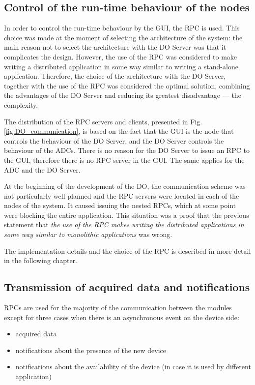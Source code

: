     \subsection{Control of the run-time behaviour of the nodes} \label{section:run_time_beh}
        
        In order to control the run-time behaviour by the GUI, the RPC is used. This choice was made at the moment of selecting the architecture of the system: the main reason not to select the architecture with the DO Server was that it complicates the design. However, the use of the RPC was considered to make writing a distributed application in some way similar to writing a stand-alone application. Therefore, the choice of the architecture with the DO Server, together with the use of the RPC was considered the optimal solution, combining the advantages of the DO Server and reducing its greatest disadvantage --- the complexity.
        
        The distribution of the RPC servers and clients, presented in Fig. \ref{fig:DO_communication}, is based on the fact that the GUI is the node that controls the behaviour of the DO Server, and the DO Server controls the behaviour of the ADCs. There is no reason for the DO Server to issue an RPC to the GUI, therefore there is no RPC server in the GUI. The same applies for the ADC and the DO Server.
        
        At the beginning of the development of the DO, the communication scheme was not particularly well planned and the RPC servers were located in each of the nodes of the system. It caused issuing the nested RPCs, which at some point were blocking the entire application. This situation was a proof that the previous statement that \textit{the use of the RPC makes writing the distributed applications in some way similar to monolithic applications} was wrong.
        
        The implementation details and the choice of the RPC is described in more detail in the following chapter.
        
    \subsection{Transmission of acquired data and notifications} \label{section:transmission_data_notifications}
        RPCs are used for the majority of the communication between the modules except for three cases when there is an asynchronous event on the device side:
        \begin{itemize}
            \item acquired data
            \item notifications about the presence of the new device
            \item notifications about the availability of the device (in case it is used by different application)
        \end{itemize}
        
